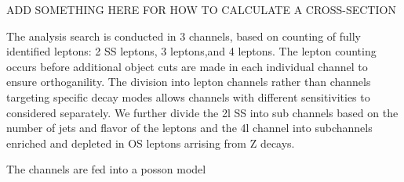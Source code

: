 ADD SOMETHING HERE FOR HOW TO CALCULATE A CROSS-SECTION

The analysis search is conducted in 3 channels, based on counting of fully identified
leptons: 2 SS leptons, 3 leptons,and 4 leptons. The lepton counting occurs before additional object cuts are made in each individual 
channel to ensure orthoganility. The division into lepton channels rather than channels targeting specific decay modes
allows channels with different sensitivities to considered separately. We further divide the 2l SS into sub channels
based on the number of jets and flavor of the leptons and the 4l channel into subchannels enriched and depleted in OS leptons arrising from Z decays. 

The channels are fed into a posson model 



